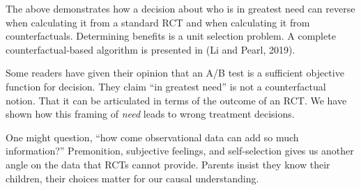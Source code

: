 \documentclass{article}
\begin{document}
The above demonstrates how a decision about who is in greatest need can reverse when calculating it from a standard RCT and when calculating it from counterfactuals. Determining benefits is a unit selection problem. A complete counterfactual-based algorithm is presented in (Li and Pearl, 2019).

Some readers have given their opinion that an A/B test is a sufficient objective function for decision. They claim ``in greatest need'' is not a counterfactual notion. That it can be articulated in terms of the outcome of an RCT. We have shown how this framing of \emph{need} leads to wrong treatment decisions.

One might question, ``how come observational data can add so much information?'' Premonition, subjective feelings, and self-selection gives us another angle on the data that RCTs cannot provide. Parents insist they know their children, their choices matter for our causal understanding.
\end{document}
